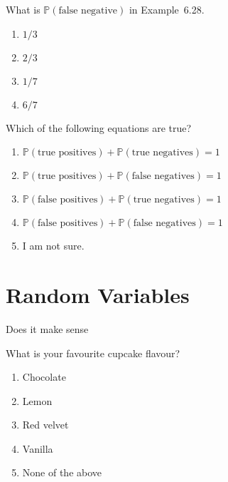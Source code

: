 \documentclass[t, 14pt]{beamer}
\begin{document}
\begin{frame}
  What is \(\mathbb{P}(\text{false negative})\) in Example~6.28.

  \begin{enumerate}
    \item \(1/3\)
    \item \(2/3\)
    \item \(1/7\)
    \item \(6/7\)
  \end{enumerate}
\end{frame}

\begin{frame}
  Which of the following equations are true?

  \begin{enumerate}
    \item \(\mathbb{P}(\text{true positives}) + \mathbb{P}(\text{true negatives}) = 1\)
    \item \(\mathbb{P}(\text{true positives}) + \mathbb{P}(\text{false negatives}) = 1\)
    \item \(\mathbb{P}(\text{false positives}) + \mathbb{P}(\text{true negatives}) = 1\)
    \item \(\mathbb{P}(\text{false positives}) + \mathbb{P}(\text{false negatives}) = 1\)
    \item I am not sure. 
  \end{enumerate}
\end{frame}

\section{Random Variables}
\begin{frame}
  Does it make sense 
\end{frame}

\begin{frame}
  What is your favourite cupcake flavour?

  \begin{enumerate}
    \item Chocolate
    \item Lemon
    \item Red velvet
    \item Vanilla
    \item None of the above
  \end{enumerate}
\end{frame}
\end{document}

